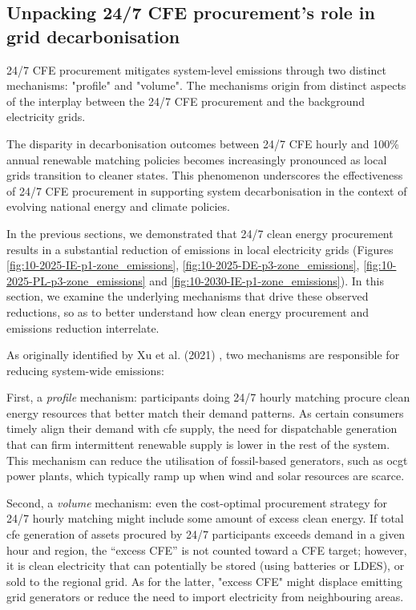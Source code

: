 \subsection{Unpacking 24/7 CFE procurement's role in grid decarbonisation}
\label{subsec:mechanisms}

\begin{res}
    24/7 CFE procurement mitigates system-level \co \newline 
    emissions through two distinct mechanisms: "profile" and "volume". The mechanisms origin from distinct aspects of the interplay between the 24/7 CFE procurement and the background electricity grids.
\end{res}

\begin{res}
    The disparity in decarbonisation outcomes between 24/7 CFE hourly and 100\% annual renewable matching policies becomes increasingly pronounced as local grids transition to cleaner states. This phenomenon underscores the effectiveness of 24/7 CFE procurement in supporting system decarbonisation in the context of evolving national energy and climate policies.
\end{res}

In the previous sections, we demonstrated that 24/7 clean energy procurement results in a substantial reduction of \co emissions in local electricity grids (Figures \ref{fig:10-2025-IE-p1-zone_emissions}, \ref{fig:10-2025-DE-p3-zone_emissions}, \ref{fig:10-2025-PL-p3-zone_emissions} and \ref{fig:10-2030-IE-p1-zone_emissions}).
In this section, we examine the underlying mechanisms that drive these observed reductions, so as to better understand how clean energy procurement and emissions reduction interrelate.

As originally identified by Xu et al. (2021) \cite{xu-247CFE-report}, two mechanisms are responsible for reducing system-wide emissions:

First, a \textit{profile} mechanism: participants doing 24/7 hourly matching procure clean energy resources that better match their demand patterns. 
As certain consumers timely align their demand with \gls{cfe} supply, the need for dispatchable generation that can firm intermittent renewable supply is lower in the rest of the system. 
This mechanism can reduce the utilisation of fossil-based generators, such as \gls{ocgt} power plants, which typically ramp up when wind and solar resources are scarce.

Second, a \textit{volume} mechanism: even the cost-optimal procurement strategy for 24/7 hourly matching might include some amount of excess clean energy.
If total \gls{cfe} generation of assets procured by 24/7 participants exceeds demand in a given hour and region, the “excess CFE” is not counted toward a CFE target; however, it is clean electricity that can potentially be stored (using batteries or LDES), or sold to the regional grid.
As for the latter, "excess CFE" might displace emitting grid generators or reduce the need to import electricity from neighbouring areas.

